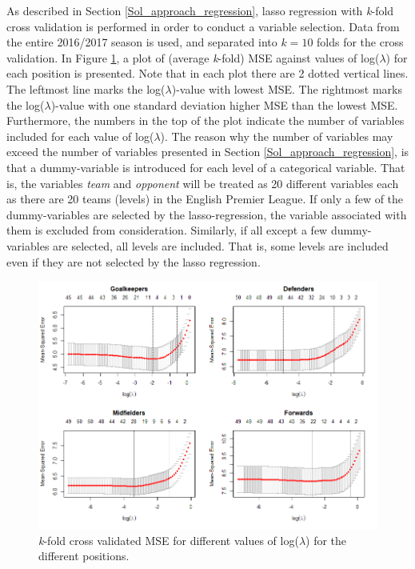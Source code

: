 As described in Section \ref{Sol_approach_regression}, lasso regression with \textit{k}-fold cross validation is performed in order to conduct a variable selection. Data from the entire 2016/2017 season is used, and separated into $\textit{k}=10$ folds for the cross validation. In Figure \ref{fig:lasso_all}, a plot of (average \textit{k}-fold) MSE against values of log($\lambda$) for each position is presented. Note that in each plot there are 2 dotted vertical lines. The leftmost line marks the log($\lambda$)-value with lowest MSE. The rightmost marks the log($\lambda$)-value with one standard deviation higher MSE than the lowest MSE. Furthermore, the numbers in the top of the plot indicate the number of variables included for each value of log($\lambda$). The reason why the number of variables may exceed the number of variables presented in Section \ref{Sol_approach_regression}, is that a dummy-variable is introduced for each level of a categorical variable. That is, the variables \textit{team} and \textit{opponent} will be treated as 20 different variables each as there are 20 teams (levels) in the English Premier League. If only a few of the dummy-variables are selected by the lasso-regression, the variable associated with them is excluded from consideration. Similarly, if all except a few dummy-variables are selected, all levels are included. That is, some levels are included even if they are not selected by the lasso regression.

\newpar

\begin{figure}[H]
    \centering
    \includegraphics[scale=0.55]{fig/chapter_6/lasso_all.png}
    \caption{\textit{k}-fold cross validated MSE for different values of log($\lambda$) for the different positions.}
\label{fig:lasso_all}    
\end{figure}

